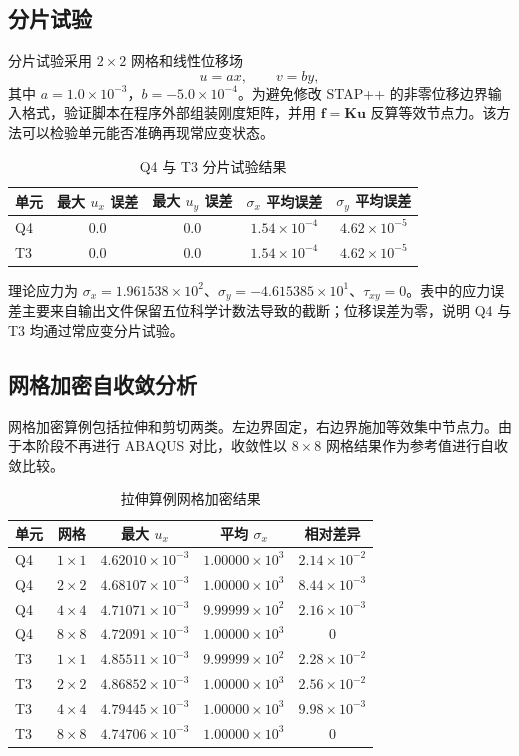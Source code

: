 ﻿\documentclass[UTF8,11pt,a4paper]{ctexart}
\begin{document}
\subsection{分片试验}
分片试验采用 $2\times2$ 网格和线性位移场
\begin{equation}
u=ax,
\qquad
v=by,
\end{equation}
其中 $a=1.0\times10^{-3}$，$b=-5.0\times10^{-4}$。为避免修改 STAP++ 的非零位移边界输入格式，验证脚本在程序外部组装刚度矩阵，并用 $\bm f=\bm K\bm u$ 反算等效节点力。该方法可以检验单元能否准确再现常应变状态。

\begin{table}[H]
\centering
\caption{Q4 与 T3 分片试验结果}
\small
\begin{tabular}{lcccc}
\toprule
单元 & 最大 $u_x$ 误差 & 最大 $u_y$ 误差 & $\sigma_x$ 平均误差 & $\sigma_y$ 平均误差 \\
\midrule
Q4 & $0.0$ & $0.0$ & $1.54\times10^{-4}$ & $4.62\times10^{-5}$ \\
T3 & $0.0$ & $0.0$ & $1.54\times10^{-4}$ & $4.62\times10^{-5}$ \\
\bottomrule
\end{tabular}
\end{table}

理论应力为 $\sigma_x=1.961538\times10^2$、$\sigma_y=-4.615385\times10^1$、$\tau_{xy}=0$。表中的应力误差主要来自输出文件保留五位科学计数法导致的截断；位移误差为零，说明 Q4 与 T3 均通过常应变分片试验。

\subsection{网格加密自收敛分析}
网格加密算例包括拉伸和剪切两类。左边界固定，右边界施加等效集中节点力。由于本阶段不再进行 ABAQUS 对比，收敛性以 $8\times8$ 网格结果作为参考值进行自收敛比较。

\begin{table}[H]
\centering
\caption{拉伸算例网格加密结果}
\small
\begin{tabular}{lcccc}
\toprule
单元 & 网格 & 最大 $u_x$ & 平均 $\sigma_x$ & 相对差异 \\
\midrule
Q4 & $1\times1$ & $4.62010\times10^{-3}$ & $1.00000\times10^3$ & $2.14\times10^{-2}$ \\
Q4 & $2\times2$ & $4.68107\times10^{-3}$ & $1.00000\times10^3$ & $8.44\times10^{-3}$ \\
Q4 & $4\times4$ & $4.71071\times10^{-3}$ & $9.99999\times10^2$ & $2.16\times10^{-3}$ \\
Q4 & $8\times8$ & $4.72091\times10^{-3}$ & $1.00000\times10^3$ & $0$ \\
T3 & $1\times1$ & $4.85511\times10^{-3}$ & $9.99999\times10^2$ & $2.28\times10^{-2}$ \\
T3 & $2\times2$ & $4.86852\times10^{-3}$ & $1.00000\times10^3$ & $2.56\times10^{-2}$ \\
T3 & $4\times4$ & $4.79445\times10^{-3}$ & $1.00000\times10^3$ & $9.98\times10^{-3}$ \\
T3 & $8\times8$ & $4.74706\times10^{-3}$ & $1.00000\times10^3$ & $0$ \\
\bottomrule
\end{tabular}
\end{table}
\end{document}

